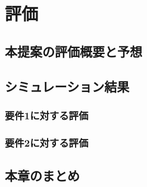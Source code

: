 \chapter{評価}
\label{chap:evaluation}
\section{本提案の評価概要と予想}
\section{シミュレーション結果}
\subsection{要件1に対する評価}
\subsection{要件2に対する評価}
\section{本章のまとめ}
